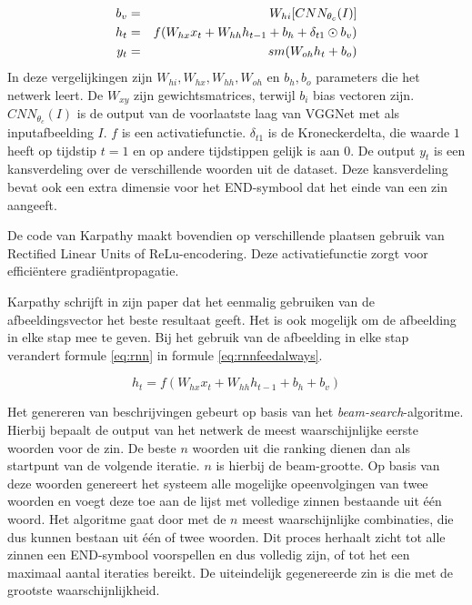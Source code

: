 \begin{eqnarray}
     \vspace{-3mm}
     \label{eq:rnnstart}
     b_v & = & W_{hi} [CNN_{\theta_c}(I)] \\
     \label{eq:rnn}
     h_t & = & f(W_{hx} x_{t} + W_{hh} h_{t-1} + b_h + \delta_{t1} \odot b_v) \\
     y_t & = & sm( W_{oh} h_t + b_o)
     \label{eq:rnnend}
\end{eqnarray}
In deze vergelijkingen zijn $W_{hi}, W_{hx}, W_{hh}, W_{oh}$ en $b_h, b_o$ parameters die het netwerk leert. De $W_{xy}$ zijn gewichtsmatrices, terwijl $b_i$ bias vectoren zijn. $CNN_{\theta_c}(I)$ is de output van de voorlaatste laag van VGGNet met als inputafbeelding $I$. $f$ is een activatiefunctie. $\delta_{t1}$ is de Kroneckerdelta, die waarde $1$ heeft op tijdstip $t=1$ en op andere tijdstippen gelijk is aan $0$. De output $y_t$ is een kansverdeling over de verschillende woorden uit de dataset. Deze kansverdeling bevat ook een extra dimensie voor het END-symbool dat het einde van een zin aangeeft. 

De code van Karpathy maakt bovendien op verschillende plaatsen gebruik van Rectified Linear Units of ReLu-encodering. Deze activatiefunctie zorgt voor effici\"entere gradi\"entpropagatie.

Karpathy schrijft in zijn paper dat het eenmalig gebruiken van de afbeeldingsvector het beste resultaat geeft. Het is ook mogelijk om de afbeelding in elke stap mee te geven. Bij het gebruik van de afbeelding in elke stap verandert formule \eqref{eq:rnn} in formule \eqref{eq:rnnfeedalways}.

\begin{equation}
     h_t = f(W_{hx} x_{t} + W_{hh} h_{t-1} + b_h + b_v)
\label{eq:rnnfeedalways}
\end{equation}

Het genereren van beschrijvingen gebeurt op basis van het \emph{beam-search}-algoritme. Hierbij bepaalt de output van het netwerk de meest waarschijnlijke eerste woorden voor de zin. De beste $n$ woorden uit die ranking dienen dan als startpunt van de volgende iteratie. $n$ is hierbij de beam-grootte. Op basis van deze woorden genereert het systeem alle mogelijke opeenvolgingen van twee woorden en voegt deze toe aan de lijst met volledige zinnen bestaande uit \'e\'en woord. Het algoritme gaat door met de $n$ meest waarschijnlijke combinaties, die dus kunnen bestaan uit \'e\'en of twee woorden. Dit proces herhaalt zicht tot alle zinnen een END-symbool voorspellen en dus volledig zijn, of tot het een maximaal aantal iteraties bereikt. De uiteindelijk gegenereerde zin is die met de grootste waarschijnlijkheid.

